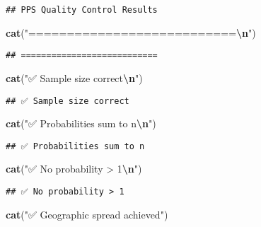 \documentclass[
]{article}
\newenvironment{Shaded}{\begin{snugshade}}{\end{snugshade}}
\newcommand{\FunctionTok}[1]{\textcolor[rgb]{0.13,0.29,0.53}{\textbf{#1}}}
\newcommand{\NormalTok}[1]{#1}
\newcommand{\SpecialCharTok}[1]{\textcolor[rgb]{0.81,0.36,0.00}{\textbf{#1}}}
\newcommand{\StringTok}[1]{\textcolor[rgb]{0.31,0.60,0.02}{#1}}
\begin{document}
\begin{verbatim}
## PPS Quality Control Results
\end{verbatim}

\begin{Shaded}
\begin{Highlighting}[]
\FunctionTok{cat}\NormalTok{(}\StringTok{"===========================}\SpecialCharTok{\textbackslash{}n}\StringTok{"}\NormalTok{)}
\end{Highlighting}
\end{Shaded}

\begin{verbatim}
## ===========================
\end{verbatim}

\begin{Shaded}
\begin{Highlighting}[]
\FunctionTok{cat}\NormalTok{(}\StringTok{"✅ Sample size correct}\SpecialCharTok{\textbackslash{}n}\StringTok{"}\NormalTok{)}
\end{Highlighting}
\end{Shaded}

\begin{verbatim}
## ✅ Sample size correct
\end{verbatim}

\begin{Shaded}
\begin{Highlighting}[]
\FunctionTok{cat}\NormalTok{(}\StringTok{"✅ Probabilities sum to n}\SpecialCharTok{\textbackslash{}n}\StringTok{"}\NormalTok{)}
\end{Highlighting}
\end{Shaded}

\begin{verbatim}
## ✅ Probabilities sum to n
\end{verbatim}

\begin{Shaded}
\begin{Highlighting}[]
\FunctionTok{cat}\NormalTok{(}\StringTok{"✅ No probability \textgreater{} 1}\SpecialCharTok{\textbackslash{}n}\StringTok{"}\NormalTok{)}
\end{Highlighting}
\end{Shaded}

\begin{verbatim}
## ✅ No probability > 1
\end{verbatim}

\begin{Shaded}
\begin{Highlighting}[]
\FunctionTok{cat}\NormalTok{(}\StringTok{"✅ Geographic spread achieved"}\NormalTok{)}
\end{Highlighting}
\end{Shaded}
\end{document}
